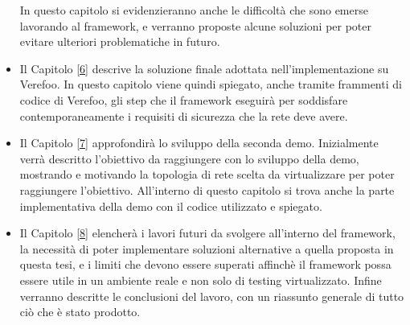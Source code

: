 \begin{itemize}
          In questo capitolo si evidenzieranno anche le difficoltà che sono emerse lavorando al framework, e verranno proposte alcune soluzioni per poter evitare ulteriori problematiche in futuro.
    \item Il Capitolo \hyperref[ch:intro]{[6]} descrive la soluzione finale adottata nell'implementazione su Verefoo. In questo capitolo viene quindi spiegato, anche tramite frammenti di codice di Verefoo, gli step
          che il framework eseguirà per soddisfare contemporaneamente i requisiti di sicurezza che la rete deve avere. 
    \item Il Capitolo \hyperref[ch:intro]{[7]} approfondirà lo sviluppo della seconda demo. Inizialmente verrà descritto l'obiettivo da raggiungere con lo sviluppo della demo, mostrando e motivando la topologia
        di rete scelta da virtualizzare per poter raggiungere l'obiettivo. All'interno di questo capitolo si trova anche la parte implementativa della demo con il codice utilizzato e spiegato.
    \item Il Capitolo \hyperref[ch:intro]{[8]} elencherà i lavori futuri da svolgere all'interno del framework, la necessità di poter implementare soluzioni
          alternative a quella proposta in questa tesi, e i limiti che devono essere superati affinchè il framework possa essere utile in un ambiente reale e non
          solo di testing virtualizzato. Infine verranno descritte le conclusioni del lavoro, con un riassunto generale di tutto ciò che è stato prodotto.
\end{itemize}